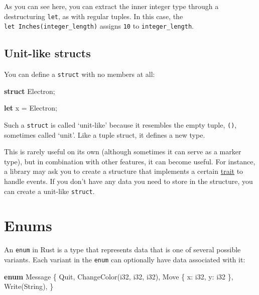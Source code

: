 \documentclass[a4paper,]{book}
\newenvironment{Shaded}{\begin{snugshade}}{\end{snugshade}}
\newcommand{\KeywordTok}[1]{\textcolor[rgb]{0.13,0.29,0.53}{\textbf{{#1}}}}
\newcommand{\DataTypeTok}[1]{\textcolor[rgb]{0.13,0.29,0.53}{{#1}}}
\newcommand{\NormalTok}[1]{{#1}}
\begin{document}
As you can see here, you can extract the inner integer type through a
destructuring \texttt{let}, as with regular tuples. In this case, the
\texttt{let\ Inches(integer\_length)} assigns \texttt{10} to
\texttt{integer\_length}.

\subsection{Unit-like structs}\label{unit-like-structs}

You can define a \texttt{struct} with no members at all:

\begin{Shaded}
\begin{Highlighting}[]
\KeywordTok{struct} \NormalTok{Electron;}

\KeywordTok{let} \NormalTok{x = Electron;}
\end{Highlighting}
\end{Shaded}

Such a \texttt{struct} is called `unit-like' because it resembles the
empty tuple, \texttt{()}, sometimes called `unit'. Like a tuple struct,
it defines a new type.

This is rarely useful on its own (although sometimes it can serve as a
marker type), but in combination with other features, it can become
useful. For instance, a library may ask you to create a structure that
implements a certain \protect\hyperlink{sec--traits}{trait} to handle
events. If you don't have any data you need to store in the structure,
you can create a unit-like \texttt{struct}.

\hypertarget{sec--enums}{\section{Enums}\label{sec--enums}}

An \texttt{enum} in Rust is a type that represents data that is one of
several possible variants. Each variant in the \texttt{enum} can
optionally have data associated with it:

\begin{Shaded}
\begin{Highlighting}[]
\KeywordTok{enum} \NormalTok{Message \{}
    \NormalTok{Quit,}
    \NormalTok{ChangeColor(}\DataTypeTok{i32}\NormalTok{, }\DataTypeTok{i32}\NormalTok{, }\DataTypeTok{i32}\NormalTok{),}
    \NormalTok{Move \{ x: }\DataTypeTok{i32}\NormalTok{, y: }\DataTypeTok{i32} \NormalTok{\},}
    \NormalTok{Write(}\DataTypeTok{String}\NormalTok{),}
\NormalTok{\}}
\end{Highlighting}
\end{Shaded}
\end{document}
